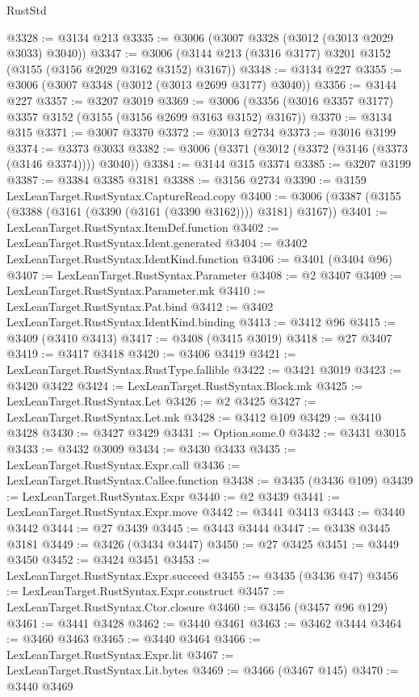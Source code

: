 \begin{lexlean}{RustStd}
\begin{coremodule}
@3328 := @3134 @213
@3335 := @3006 (@3007 @3328 (@3012 (@3013 @2029 @3033) @3040))
@3347 := @3006 (@3144 @213 (@3316 @3177) @3201 @3152 (@3155 (@3156 @2029 @3162 @3152) @3167))
@3348 := @3134 @227
@3355 := @3006 (@3007 @3348 (@3012 (@3013 @2699 @3177) @3040))
@3356 := @3144 @227
@3357 := @3207 @3019
@3369 := @3006 (@3356 (@3016 @3357 @3177) @3357 @3152 (@3155 (@3156 @2699 @3163 @3152) @3167))
@3370 := @3134 @315
@3371 := @3007 @3370
@3372 := @3013 @2734
@3373 := @3016 @3199
@3374 := @3373 @3033
@3382 := @3006 (@3371 (@3012 (@3372 (@3146 (@3373 (@3146 @3374)))) @3040))
@3384 := @3144 @315 @3374
@3385 := @3207 @3199
@3387 := @3384 @3385 @3181
@3388 := @3156 @2734
@3390 := @3159 LexLeanTarget.RustSyntax.CaptureRead.copy
@3400 := @3006 (@3387 (@3155 (@3388 (@3161 (@3390 (@3161 (@3390 @3162)))) @3181) @3167))
@3401 := LexLeanTarget.RustSyntax.ItemDef.function
@3402 := LexLeanTarget.RustSyntax.Ident.generated
@3404 := @3402 LexLeanTarget.RustSyntax.IdentKind.function
@3406 := @3401 (@3404 @96)
@3407 := LexLeanTarget.RustSyntax.Parameter
@3408 := @2 @3407
@3409 := LexLeanTarget.RustSyntax.Parameter.mk
@3410 := LexLeanTarget.RustSyntax.Pat.bind
@3412 := @3402 LexLeanTarget.RustSyntax.IdentKind.binding
@3413 := @3412 @96
@3415 := @3409 (@3410 @3413)
@3417 := @3408 (@3415 @3019)
@3418 := @27 @3407
@3419 := @3417 @3418
@3420 := @3406 @3419
@3421 := LexLeanTarget.RustSyntax.RustType.fallible
@3422 := @3421 @3019
@3423 := @3420 @3422
@3424 := LexLeanTarget.RustSyntax.Block.mk
@3425 := LexLeanTarget.RustSyntax.Let
@3426 := @2 @3425
@3427 := LexLeanTarget.RustSyntax.Let.mk
@3428 := @3412 @109
@3429 := @3410 @3428
@3430 := @3427 @3429
@3431 := Option.some.{0}
@3432 := @3431 @3015
@3433 := @3432 @3009
@3434 := @3430 @3433
@3435 := LexLeanTarget.RustSyntax.Expr.call
@3436 := LexLeanTarget.RustSyntax.Callee.function
@3438 := @3435 (@3436 @109)
@3439 := LexLeanTarget.RustSyntax.Expr
@3440 := @2 @3439
@3441 := LexLeanTarget.RustSyntax.Expr.move
@3442 := @3441 @3413
@3443 := @3440 @3442
@3444 := @27 @3439
@3445 := @3443 @3444
@3447 := @3438 @3445 @3181
@3449 := @3426 (@3434 @3447)
@3450 := @27 @3425
@3451 := @3449 @3450
@3452 := @3424 @3451
@3453 := LexLeanTarget.RustSyntax.Expr.succeed
@3455 := @3435 (@3436 @47)
@3456 := LexLeanTarget.RustSyntax.Expr.construct
@3457 := LexLeanTarget.RustSyntax.Ctor.closure
@3460 := @3456 (@3457 @96 @129)
@3461 := @3441 @3428
@3462 := @3440 @3461
@3463 := @3462 @3444
@3464 := @3460 @3463
@3465 := @3440 @3464
@3466 := LexLeanTarget.RustSyntax.Expr.lit
@3467 := LexLeanTarget.RustSyntax.Lit.bytes
@3469 := @3466 (@3467 @145)
@3470 := @3440 @3469

\end{coremodule}
\end{lexlean}
